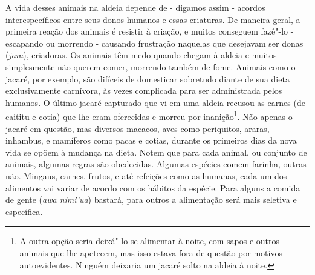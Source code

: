 A vida desses animais na aldeia depende de - digamos assim - acordos
interespecíficos entre seus donos humanos e essas criaturas. De maneira
geral, a primeira reação dos animais é resistir à criação, e muitos
conseguem fazê"-lo - escapando ou morrendo - causando frustração naquelas
que desejavam ser donas (\emph{jara}), criadoras. Os animais têm medo
quando chegam à aldeia e muitos simplesmente não querem comer, morrendo
também de fome. Animais como o jacaré, por exemplo, são difíceis de
domesticar sobretudo diante de sua dieta exclusivamente carnívora, às
vezes complicada para ser administrada pelos humanos. O último jacaré
capturado que vi em uma aldeia recusou as carnes (de caititu e cotia)
que lhe eram oferecidas e morreu por inanição\footnote{A outra opção
  seria deixá"-lo se alimentar à noite, com sapos e outros animais que
  lhe apetecem, mas isso estava fora de questão por motivos
  autoevidentes. Ninguém deixaria um jacaré solto na aldeia à noite.}.
Não apenas o jacaré em questão, mas diversos macacos, aves como
periquitos, araras, inhambus, e mamíferos como pacas e cotias, durante
os primeiros dias da nova vida se opõem à mudança na dieta. Notem que
para cada animal, ou conjunto de animais, algumas regras são obedecidas.
Algumas espécies comem farinha, outras não. Mingaus, carnes, frutos, e
até refeições como as humanas, cada um dos alimentos vai variar de
acordo com os hábitos da espécie. Para alguns a comida de gente
(\emph{awa nimi'ua}) bastará, para outros a alimentação será mais
seletiva e específica.

